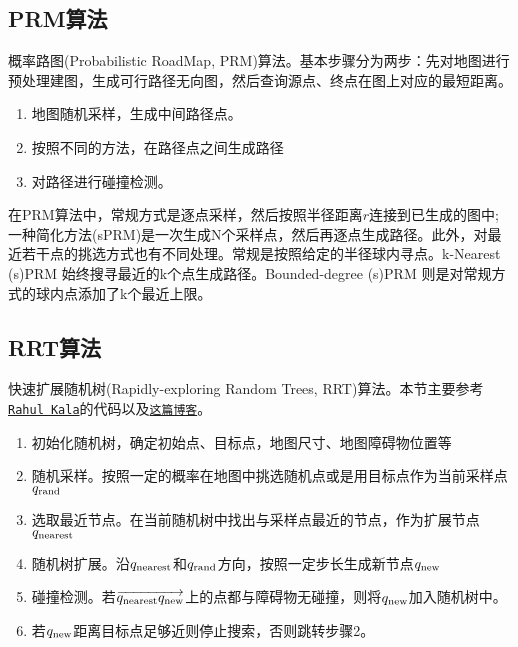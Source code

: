 \subsection{PRM算法}
概率路图(Probabilistic RoadMap, PRM)算法。基本步骤分为两步：先对地图进行预处理建图，生成可行路径无向图，然后查询源点、终点在图上对应的最短距离。


\begin{enumerate}
\item 地图随机采样，生成中间路径点。
\item 按照不同的方法，在路径点之间生成路径
\item 对路径进行碰撞检测。
\end{enumerate}

在PRM算法中，常规方式是逐点采样，然后按照半径距离$r$连接到已生成的图中;一种简化方法(sPRM)是一次生成N个采样点，然后再逐点生成路径。此外，对最近若干点的挑选方式也有不同处理。常规是按照给定的半径球内寻点。k-Nearest (s)PRM 始终搜寻最近的k个点生成路径。Bounded-degree (s)PRM 则是对常规方式的球内点添加了k个最近上限。


\subsection{RRT算法}
快速扩展随机树(Rapidly-exploring Random Trees, RRT)算法。本节主要参考\href{http://rkala.in/codes/RRT.zip}{\texttt{Rahul Kala}}的代码以及\href{http://www.cnblogs.com/21207-iHome/p/7210543.html}{\texttt{这篇博客}}。


\begin{enumerate}
\item 初始化随机树，确定初始点、目标点，地图尺寸、地图障碍物位置等
\item 随机采样。按照一定的概率在地图中挑选随机点或是用目标点作为当前采样点$q_\rm{rand}$
\item 选取最近节点。在当前随机树中找出与采样点最近的节点，作为扩展节点$q_\rm{nearest}$
\item 随机树扩展。沿$q_\rm{nearest}$和$q_\rm{rand}$方向，按照一定步长生成新节点$q_\rm{new}$
\item 碰撞检测。若$\overrightarrow{q_\rm{nearest} q_\rm{new}}$上的点都与障碍物无碰撞，则将$q_\rm{new}$加入随机树中。
\item 若$q_\rm{new}$距离目标点足够近则停止搜索，否则跳转步骤2。
\end{enumerate}

